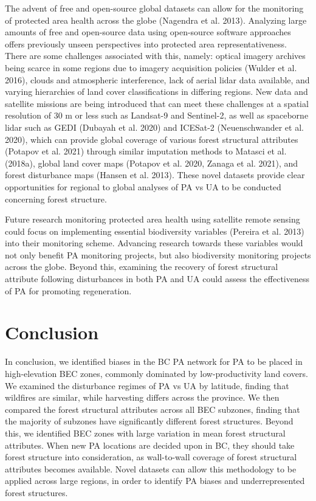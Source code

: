 \documentclass[11pt]{article}
\begin{document}
The advent of free and open-source global datasets can allow for the
monitoring of protected area health across the globe (Nagendra et al.
2013). Analyzing large amounts of free and open-source data using
open-source software approaches offers previously unseen perspectives
into protected area representativeness. There are some challenges
associated with this, namely: optical imagery archives being scarce in
some regions due to imagery acquisition policies (Wulder et al. 2016),
clouds and atmospheric interference, lack of aerial lidar data
available, and varying hierarchies of land cover classifications in
differing regions. New data and satellite missions are being introduced
that can meet these challenges at a spatial resolution of 30 m or less
such as Landsat-9 and Sentinel-2, as well as spaceborne lidar such as
GEDI (Dubayah et al. 2020) and ICESat-2 (Neuenschwander et al. 2020),
which can provide global coverage of various forest structural
attributes (Potapov et al. 2021) through similar imputation methods to
Matasci et al. (2018a), global land cover maps (Potapov et al. 2020,
Zanaga et al. 2021), and forest disturbance maps (Hansen et al. 2013).
These novel datasets provide clear opportunities for regional to global
analyses of PA vs UA to be conducted concerning forest structure.

Future research monitoring protected area health using satellite remote
sensing could focus on implementing essential biodiversity variables
(Pereira et al. 2013) into their monitoring scheme. Advancing research
towards these variables would not only benefit PA monitoring projects,
but also biodiversity monitoring projects across the globe. Beyond this,
examining the recovery of forest structural attribute following
disturbances in both PA and UA could assess the effectiveness of PA for
promoting regeneration.

\hypertarget{conclusion}{%
\section{Conclusion}\label{conclusion}}

In conclusion, we identified biases in the BC PA network for PA to be
placed in high-elevation BEC zones, commonly dominated by
low-productivity land covers. We examined the disturbance regimes of PA
vs UA by latitude, finding that wildfires are similar, while harvesting
differs across the province. We then compared the forest structural
attributes across all BEC subzones, finding that the majority of
subzones have significantly different forest structures. Beyond this, we
identified BEC zones with large variation in mean forest structural
attributes. When new PA locations are decided upon in BC, they should
take forest structure into consideration, as wall-to-wall coverage of
forest structural attributes becomes available. Novel datasets can allow
this methodology to be applied across large regions, in order to
identify PA biases and underrepresented forest structures.
\end{document}
